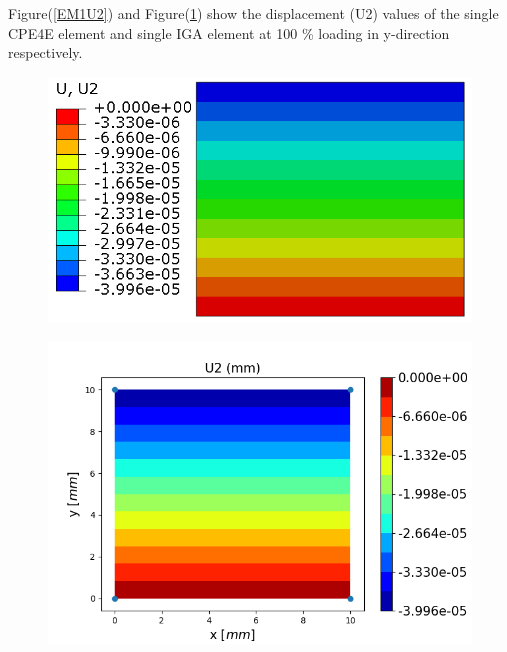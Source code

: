 \documentclass[11pt]{article}
\begin{document}
\noindent
Figure(\ref{EM1U2}) and Figure(\ref{EM1U2_IGA}) show the displacement (U2) values of the single CPE4E element and single IGA element at 100 \% loading in y-direction respectively. \\
\begin{figure}[H]
	\centering
	\begin{minipage}{.5\textwidth}
		\centering
		\includegraphics[width=1\linewidth]{EM1U2.png}
		\label{EM1U2}
	\end{minipage}%
	\begin{minipage}{.6\textwidth}
		\centering
		\includegraphics[width=1\linewidth]{EM1U2_IGA.png}
		\label{EM1U2_IGA}
	\end{minipage}
\end{figure}
\end{document}
